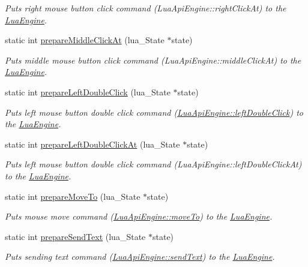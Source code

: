 \begin{DoxyCompactItemize}
\begin{DoxyCompactList}\small\item\em Puts right mouse button click command (Lua\-Api\-Engine\-::right\-Click\-At) to the \hyperlink{class_lua_engine}{Lua\-Engine}. \end{DoxyCompactList}\item 
static int \hyperlink{class_lua_api_engine_a3ecc218b3b366bde3d8c4e7c8f039f5e}{prepare\-Middle\-Click\-At} (lua\-\_\-\-State $\ast$state)
\begin{DoxyCompactList}\small\item\em Puts middle mouse button click command (Lua\-Api\-Engine\-::middle\-Click\-At) to the \hyperlink{class_lua_engine}{Lua\-Engine}. \end{DoxyCompactList}\item 
static int \hyperlink{class_lua_api_engine_ab545cafb77e825b84d787d0dbae34bc2}{prepare\-Left\-Double\-Click} (lua\-\_\-\-State $\ast$state)
\begin{DoxyCompactList}\small\item\em Puts left mouse button double click command (\hyperlink{class_lua_api_engine_a2004f3ce56fc785e0276491642e39e7a}{Lua\-Api\-Engine\-::left\-Double\-Click}) to the \hyperlink{class_lua_engine}{Lua\-Engine}. \end{DoxyCompactList}\item 
static int \hyperlink{class_lua_api_engine_afb3a41719b02c24b851ff53a029207e6}{prepare\-Left\-Double\-Click\-At} (lua\-\_\-\-State $\ast$state)
\begin{DoxyCompactList}\small\item\em Puts left mouse button double click command (Lua\-Api\-Engine\-::left\-Double\-Click\-At) to the \hyperlink{class_lua_engine}{Lua\-Engine}. \end{DoxyCompactList}\item 
static int \hyperlink{class_lua_api_engine_a700aa78e4509bca70b5b23cfe98ce7b3}{prepare\-Move\-To} (lua\-\_\-\-State $\ast$state)
\begin{DoxyCompactList}\small\item\em Puts mouse move command (\hyperlink{class_lua_api_engine_a8512ba309e37218b1586f8a41cae4451}{Lua\-Api\-Engine\-::move\-To}) to the \hyperlink{class_lua_engine}{Lua\-Engine}. \end{DoxyCompactList}\item 
static int \hyperlink{class_lua_api_engine_a8f327b5c6d5819c9078b53a665842c47}{prepare\-Send\-Text} (lua\-\_\-\-State $\ast$state)
\begin{DoxyCompactList}\small\item\em Puts sending text command (\hyperlink{class_lua_api_engine_a396ae61c3f7c771f5fe06584cef15169}{Lua\-Api\-Engine\-::send\-Text}) to the \hyperlink{class_lua_engine}{Lua\-Engine}. \end{DoxyCompactList}\item 

\end{DoxyCompactItemize}

